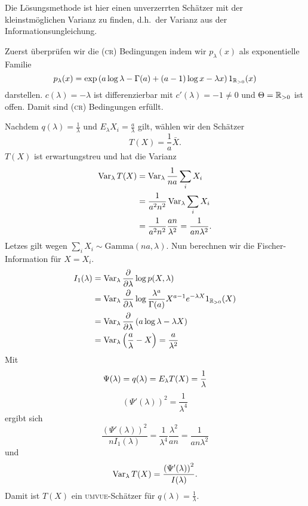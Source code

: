 \solution Die Lösungsmethode ist hier einen unverzerrten Schätzer mit der
kleinstmöglichen Varianz zu finden, d.h.\ der Varianz aus der Informationsungleichung.

Zuerst überprüfen wir die (\textsc{cr}) Bedingungen indem wir $p_\lambda(x)$ als
exponentielle Familie
\begin{equation*}
    p_\lambda(x) = \exp\left( a\log \lambda -\Gamma(a) +(a-1)\log x -\lambda x  \right) 1_{\mathbb R_{>0}}(x)    
\end{equation*}
darstellen. $c(\lambda)=-\lambda$ ist differenzierbar mit $c'(\lambda)=-1\neq 0$ und 
$\Theta=\mathbb R_{>0}$ ist offen. Damit sind \textsc{(cr)} Bedingungen erfüllt.

Nachdem $q(\lambda)=\frac{1}{\lambda}$ und $E_\lambda X_i=\frac{a}{\lambda}$ gilt, 
wählen wir den Schätzer 
\begin{equation*}
    T(X)=\frac{1}{a}\bar X.
\end{equation*}
$T(X)$ ist erwartungstreu und hat
die Varianz
\begin{align*}
    \operatorname{Var}_\lambda T(X) &=  \operatorname{Var}_\lambda \frac{1}{na} \sum_{i}^{} X_i \\ 
    &= \frac{1}{a^2 n^2} \operatorname{Var}_\lambda \sum_{i}^{} X_i \\
    &= \frac{1}{a^2 n^2} \frac{an}{\lambda^2} = \frac{1}{an \lambda^2}. 
\end{align*}
Letzes gilt wegen $\sum_{i}^{} X_i \sim \textrm{Gamma}(na,\lambda)$. Nun
berechnen wir die Fischer-Information für $X=X_i$.
\begin{align*}
    I_1(\lambda) &= \operatorname{Var}_\lambda \frac{\partial}{\partial \lambda} \log p(X,\lambda) \\
    &= \operatorname{Var}_\lambda \frac{\partial}{\partial \lambda} \log \frac{\lambda^a}{\Gamma(a)} X^{a-1}e^{-\lambda X} 1_{\mathbb R_{>0}}(X) \\
    &= \operatorname{Var}_\lambda \frac{\partial}{\partial \lambda} \left( a \log \lambda - \lambda X \right) \\
    &= \operatorname{Var}_\lambda \left( \frac{a}{\lambda} - X \right) = \frac{a}{\lambda^2}
\end{align*}
Mit 
\begin{equation*}
    \Psi(\lambda) = q(\lambda)=E_\lambda T(X) =\frac{1}{\lambda} \\
\end{equation*}
\begin{equation*}
    \left( \Psi'(\lambda) \right)^2 = \frac{1}{\lambda^4}
\end{equation*}
ergibt sich 
\begin{equation*}
    \frac{  \left( \Psi'(\lambda) \right)^2 }{n I_1(\lambda)} 
    = \frac{1}{\lambda^4} \frac{\lambda^2}{an} = \frac{1}{ an \lambda^2}
\end{equation*}
und
\begin{equation*}
    \operatorname{Var}_{\lambda} T(X) = \frac{  \left( \Psi'(\lambda) \right)^2 }{I(\lambda)}.
\end{equation*}
Damit ist $T(X)$ ein \textsc{umvue}-Schätzer für $q(\lambda)=\frac{1}{\lambda}$.







